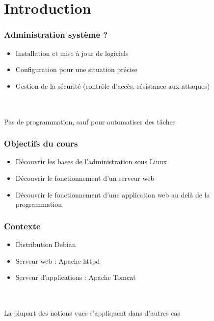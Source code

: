 \section*{Introduction}

\begin{frame}
	\frametitle{Administration système ?}
	
	\begin{itemize}
		\item Installation et mise à jour de logiciels
		\item Configuration pour une situation précise
		\item Gestion de la sécurité (contrôle d'accès, résistance aux attaques)
	\end{itemize}
	~\\
	~\\	
	
	Pas de programmation, sauf pour automatiser des tâches

\end{frame}

\begin{frame}
	\frametitle{Objectifs du cours}
	
	\begin{itemize}
		\item Découvrir les bases de l'administration sous Linux
		\item Découvrir le fonctionnement d'un serveur web
		\item Découvrir le fonctionnement d'une application web au delà de la programmation
	\end{itemize}
\end{frame}

\begin{frame}
	\frametitle{Contexte}
	
	\begin{itemize}
		\item Distribution Debian
		\item Serveur web : Apache httpd
		\item Serveur d'applications : Apache Tomcat
	\end{itemize}
	
	~\\
	~\\	
	La plupart des notions vues s'appliquent dans d'autres cas
\end{frame}